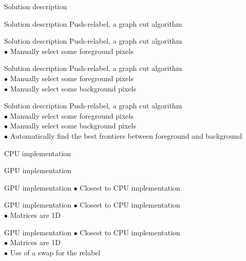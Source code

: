 \documentclass[10pt]{beamer}
\begin{document}
\begin{frame}{Solution description}
\end{frame}

\begin{frame}{Solution description}
Push-relabel, a graph cut algorithm
\end{frame}

\begin{frame}{Solution description}
Push-relabel, a graph cut algorithm\\
$\bullet$ Manually select some foreground pixels
\end{frame}

\begin{frame}{Solution description}
Push-relabel, a graph cut algorithm\\
$\bullet$ Manually select some foreground pixels\\
$\bullet$ Manually select some background pixels
\end{frame}

\begin{frame}{Solution description}
Push-relabel, a graph cut algorithm\\
$\bullet$ Manually select some foreground pixels\\
$\bullet$ Manually select some background pixels\\
$\bullet$ Automatically find the best frontiers between foreground and
background
\end{frame}

\begin{frame}{CPU implementation}
\end{frame}

\begin{frame}{GPU implementation}
\end{frame}

\begin{frame}{GPU implementation}
$\bullet$ Closest to CPU implementation
\end{frame}

\begin{frame}{GPU implementation}
$\bullet$ Closest to CPU implementation \\
$\bullet$ Matrices are 1D \\
\end{frame}

\begin{frame}{GPU implementation}
$\bullet$ Closest to CPU implementation \\
$\bullet$ Matrices are 1D \\
$\bullet$ Use of a swap for the relabel \\
\end{frame}
\end{document}
